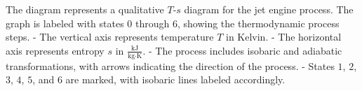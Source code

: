 The diagram represents a qualitative \( T \)-\( s \) diagram for the jet engine process. The graph is labeled with states \( 0 \) through \( 6 \), showing the thermodynamic process steps.  
- The vertical axis represents temperature \( T \) in Kelvin.  
- The horizontal axis represents entropy \( s \) in \( \frac{\text{kJ}}{\text{kg·K}} \).  
- The process includes isobaric and adiabatic transformations, with arrows indicating the direction of the process.  
- States \( 1 \), \( 2 \), \( 3 \), \( 4 \), \( 5 \), and \( 6 \) are marked, with isobaric lines labeled accordingly.